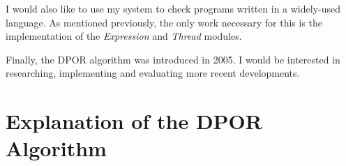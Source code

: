 \documentclass[12pt,a4paper,twoside,openright]{report}
\begin{document}
I would also like
to use my system to check
programs written in a widely-used
language. As mentioned previously,
the only work necessary for this
is the implementation of the
\textit{Expression} and
\textit{Thread} modules.

Finally, the DPOR algorithm
was introduced in 2005. I would
be interested in researching,
implementing and evaluating more
recent developments.



\appendix

\chapter{Explanation of the DPOR Algorithm}
\label{app:dpor-walkthrough}
\dporpseudocode
\end{document}
